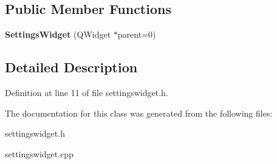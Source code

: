 \subsection*{Public Member Functions}
\begin{DoxyCompactItemize}
\item 
\hypertarget{class_settings_widget_ab381a630fcf24d7fe49ab7bd2896c052}{{\bfseries Settings\-Widget} (Q\-Widget $\ast$parent=0)}\label{class_settings_widget_ab381a630fcf24d7fe49ab7bd2896c052}

\end{DoxyCompactItemize}


\subsection{Detailed Description}


Definition at line 11 of file settingswidget.\-h.



The documentation for this class was generated from the following files\-:\begin{DoxyCompactItemize}
\item 
settingswidget.\-h\item 
settingswidget.\-cpp\end{DoxyCompactItemize}
